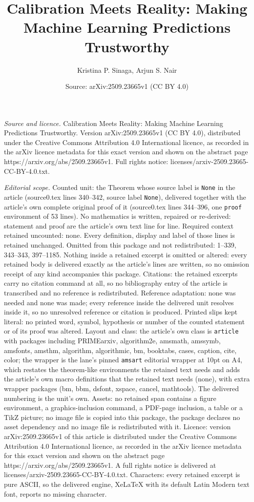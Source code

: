 \documentclass[10pt,a4paper]{amsart}
\title[Calibration Meets Reality: Making Machine Learning Predictio]{Calibration Meets Reality: Making Machine Learning Predictions Trustworthy}
\author{Kristina P. Sinaga, Arjun S. Nair}
\date{Source: arXiv:2509.23665v1 (CC BY 4.0)}
\begin{document}
\maketitle

\noindent\emph{Source and licence.} Calibration Meets Reality: Making Machine Learning Predictions Trustworthy. Version arXiv:2509.23665v1 (CC BY 4.0), distributed under the Creative Commons Attribution 4.0 International licence, as recorded in the arXiv licence metadata for this exact version and shown on the abstract page https://arxiv.org/abs/2509.23665v1. Full rights notice: licenses/arxiv-2509.23665-CC-BY-4.0.txt.\par\smallskip

\noindent\textit{Editorial scope.} Counted unit: the Theorem whose source label is \texttt{None} in the article (source0.tex lines 340--342, source label \texttt{None}), delivered together with the article's own complete original proof of it (source0.tex lines 344--396, one \texttt{proof} environment of 53 lines). No mathematics is written, repaired or re-derived: statement and proof are the article's own text line for line. Required context retained uncounted: none. Every definition, display and label of those lines is retained unchanged. Omitted from this package and not redistributed: 1--339, 343--343, 397--1185. Nothing inside a retained excerpt is omitted or altered: every retained body is delivered exactly as the article's lines are written, so no omission receipt of any kind accompanies this package. Citations: the retained excerpts carry no citation command at all, so no bibliography entry of the article is transcribed and no reference is redistributed. Reference adaptation: none was needed and none was made; every reference inside the delivered unit resolves inside it, so no unresolved reference or citation is produced. Printed slips kept literal: no printed word, symbol, hypothesis or number of the counted statement or of its proof was altered. Layout and class: the article's own class is \texttt{article} with packages including PRIMEarxiv, algorithm2e, amsmath, amssymb, amsfonts, amsthm, algorithm, algorithmic, bm, booktabs, cases, caption, cite, color; the wrapper is the lane's pinned \texttt{amsart} editorial wrapper at 10pt on A4, which restates the theorem-like environments the retained text needs and adds the article's own macro definitions that the retained text needs (none), with extra wrapper packages (bm, bbm, dsfont, xspace, cancel, mathtools). The delivered numbering is the unit's own. Assets: no retained span contains a figure environment, a graphics-inclusion command, a PDF-page inclusion, a table or a TikZ picture; no image file is copied into this package, the package declares no asset dependency and no image file is redistributed with it. Licence: version arXiv:2509.23665v1 of this article is distributed under the Creative Commons Attribution 4.0 International licence, as recorded in the arXiv licence metadata for this exact version and shown on the abstract page https://arxiv.org/abs/2509.23665v1. A full rights notice is delivered at licenses/arxiv-2509.23665-CC-BY-4.0.txt. Characters: every retained excerpt is pure ASCII, so the delivered engine, XeLaTeX with its default Latin Modern text font, reports no missing character.
\end{document}
